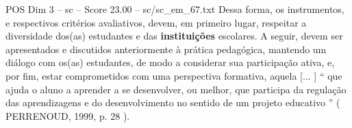 \begin{textsample}{POS Dim 3 – sc – Score 23.00 – sc/sc\_em\_67.txt}
Dessa forma, os instrumentos, e respectivos critérios avaliativos, devem, em primeiro lugar, respeitar a diversidade dos(as) estudantes e das \textbf{instituições} escolares.
A seguir, devem ser apresentados e discutidos anteriormente à prática pedagógica, mantendo um diálogo com os(as) estudantes, de modo a considerar sua participação ativa, e, por fim, estar comprometidos com uma perspectiva formativa, aquela [... ] “ que ajuda o aluno a aprender a se desenvolver, ou melhor, que participa da regulação das aprendizagens e do desenvolvimento no sentido de um projeto educativo ” ( PERRENOUD, 1999, p. 28 ).

\end{textsample}
